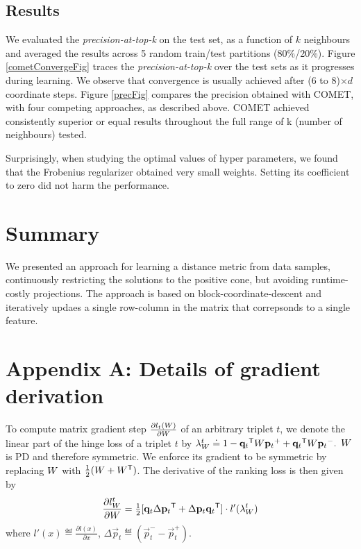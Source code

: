 \documentclass{article}
\begin{document}
\subsection{Results}
 We evaluated the \textit{precision-at-top-k} on the test set, as a function of $k$ neighbours and averaged the results across 5 random train/test partitions (80\%/20\%).
Figure \ref{cometConvergeFig} traces the \textit{precision-at-top-k} over the test sets as it progresses during learning. We observe that convergence is usually achieved after (6 to 8)$\times d$ coordinate steps.
Figure \ref{precFig} compares the precision obtained with COMET, with four competing approaches, as described above. COMET achieved consistently superior or equal results throughout the full range of k (number of neighbours) tested. 

Surprisingly, when studying the optimal values of hyper parameters, we found that the Frobenius regularizer obtained very small weights. Setting its coefficient to zero did not harm the performance.




\section{Summary}
We presented an approach for learning a distance metric from data samples,  continuously restricting the solutions to the positive cone, but avoiding runtime-costly projections. The approach is based on block-coordinate-descent and iteratively updaes a single row-column in the matrix that correpsonds to a single feature. 




\appendix
\section*{Appendix A: Details of gradient derivation}
\label{appendix-grad}

To compute matrix gradient step  $\frac{\partial {l_t ({W})}}{\partial {W}}$ of an arbitrary triplet $t$, we denote the linear part of the hinge loss of a triplet $t$ by
$\lambda_{W}^t \doteq 
1-{{\mathbf{q}}_{{t}}}{}^\mathsf{T} {W} {{\mathbf{p}}_{{t}}}^{+} + {{\mathbf{q}}_{{t}}}{}^\mathsf{T}{W}{{\mathbf{p}}_{{t}}}^{-}.$
${W}$ is PD and therefore symmetric. We enforce its gradient to be symmetric by replacing ${W}$ with $\tfrac{1}{2}({W} + {W}{}^\mathsf{T})$.
The derivative of the ranking loss is then given by
\begin{equation}
\frac{\partial {l_{{W}}^{t}}}{\partial {W}} = \tfrac{1}{2}[\mathbf{q}_{t}\Delta\mathbf{p}_{t}{}^\mathsf{T}  + \Delta\mathbf{p}_{t}\mathbf{q}_{t}{}^\mathsf{T}]\cdot {l'}(\lambda_{W}^t)
\label{dlossranking}
\end{equation} where $l'(x) \eqdef \frac{\partial {l(x)}}{\partial x}$, $\Delta\vec{p}_{t} \eqdef (\vec{p}_{t}^{-} - \vec{p}_{t}^{+})$.
\end{document}
